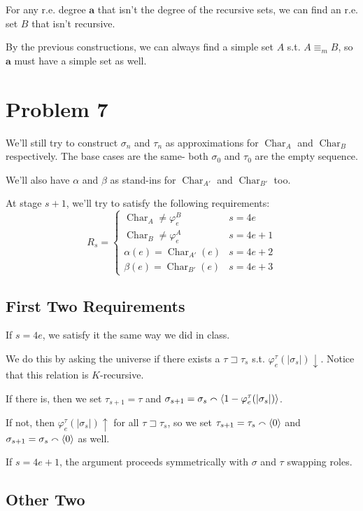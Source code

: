 \documentclass[12pt]{article}
\DeclareMathOperator{\ch}{Char}
\begin{document}
For any r.e. degree $\mathbf{a}$ that isn't the degree of the recursive sets,
we can find an r.e. set $B$ that isn't recursive.

By the previous constructions, we can always find a simple set $A$ s.t. $A \equiv_m B$,
so $\mathbf{a}$ must have a simple set as well.

\section{Problem 7}

We'll still try to construct $\sigma_n$ and $\tau_n$
as approximations for $\ch_A$ and $\ch_B$ respectively.
The base cases are the same- both $\sigma_0$ and $\tau_0$ are the empty sequence.

We'll also have $\alpha$ and $\beta$ as stand-ins for $\ch_{A'}$ and $\ch_{B'}$ too.

At stage $s+1$, we'll try to satisfy the following requirements:
\[R_s=\begin{cases}
    \ch_A \ne \varphi_e^B & s=4e   \\
    \ch_B \ne \varphi_e^A & s=4e+1 \\
    \alpha(e)=\ch_{A'}(e) & s=4e+2 \\
    \beta(e)=\ch_{B'}(e)  & s=4e+3
  \end{cases}\]

\subsection{First Two Requirements}

If $s=4e$, we satisfy it the same way we did in class.

We do this by asking the universe if there exists a
$\tau \sqsupset \tau_s$ s.t. $\varphi_e^\tau(|\sigma_s|)\downarrow$.
Notice that this relation is $K$-recursive.

If there is, then we set $\tau_{s+1}=\tau$ and
$\sigma_{s+1}=\sigma_s \smallfrown \braket{1 - \varphi_e^\tau(|\sigma_s|)}$.

If not, then $\varphi_e^\tau(|\sigma_s|)\uparrow$ for all $\tau \sqsupset \tau_s$,
so we set $\tau_{s+1}=\tau_s \smallfrown \braket{0}$ and $\sigma_{s+1}=\sigma_s \smallfrown \braket{0}$ as well.

If $s=4e+1$, the argument proceeds symmetrically with $\sigma$ and $\tau$ swapping roles.

\subsection{Other Two}
\end{document}
